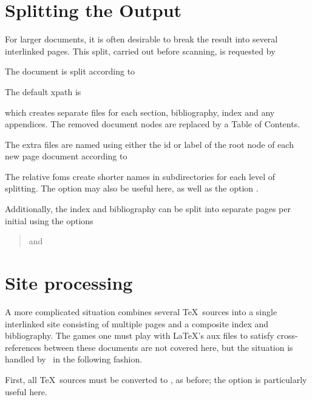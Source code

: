 \documentclass{report}
\begin{document}
\section{Splitting the Output}\label{usage.multiple}
For larger documents, it is often desirable to break the 
result into several interlinked pages. This split,
carried out before scanning, is requested by 
\begin{quote}
\end{quote}
The document is split according to
\begin{quote}
\end{quote}
The default xpath is
\begin{quote}
\end{quote}
which creates separate files for each section,
bibliography, index and any appendices.
The removed document nodes are replaced by a Table of Contents.

The extra files are named using either the id or label
of the root node of each new page document according to
\begin{quote}
\end{quote}
The relative foms create shorter names in subdirectories for each
level of splitting.
The  option may also be useful here,
as well as the  option .

Additionally, the index and bibliography can be split
into separate pages per initial using the options
\begin{quote}
   and 
\end{quote}

\section{Site processing}\label{usage.site}
A more complicated situation combines several \TeX\ sources
into a single interlinked site consisting of multiple pages
and a composite index and bibliography.
The games one must play with \LaTeX's aux files to satisfy cross-references
between these documents are not covered here, but the situation is handled
by \LaTeXML\ in the following fashion.

First, all \TeX\ sources must be converted to \XML, as before;
the option  is particularly useful here.
\end{document}
